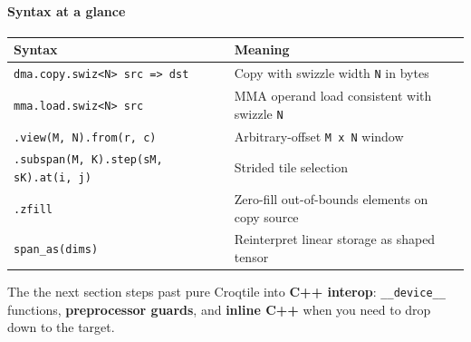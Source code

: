 \paragraph*{Syntax at a glance}

\begin{table}[htbp]
\centering\small
\begin{tabularx}{\linewidth}{@{}lX@{}}
\toprule
\textbf{Syntax} & \textbf{Meaning} \\
\midrule
\texttt{dma.\allowbreak{}copy.\allowbreak{}swiz\textless{}N\textgreater{} src =\textgreater{} dst} & Copy with swizzle width \texttt{N} in bytes \\
\texttt{mma.\allowbreak{}load.\allowbreak{}swiz\textless{}N\textgreater{} src} & MMA operand load consistent with swizzle \texttt{N} \\
\texttt{.\allowbreak{}view(M, N).\allowbreak{}from(r, c)} & Arbitrary-offset \texttt{M x N} window \\
\texttt{.\allowbreak{}subspan(M, K).\allowbreak{}step(sM, sK).\allowbreak{}at(i, j)} & Strided tile selection \\
\texttt{.zfill} & Zero-fill out-of-bounds elements on copy source \\
\texttt{span\_as(dims)} & Reinterpret linear storage as shaped tensor \\
\bottomrule
\end{tabularx}
\end{table}

The the next section steps past pure Croqtile into \textbf{C++ interop}: \texttt{\_\_device\_\_} functions, \textbf{preprocessor guards}, and \textbf{inline C++} when you need to drop down to the target.
